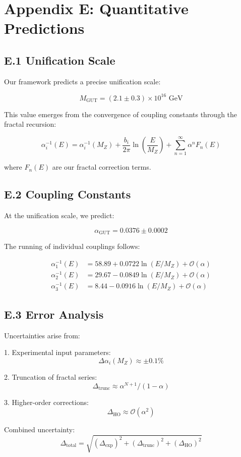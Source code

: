 \section*{Appendix E: Quantitative Predictions}

\subsection*{E.1 Unification Scale}

Our framework predicts a precise unification scale:

\[
M_{\text{GUT}} = (2.1 \pm 0.3) \times 10^{16} \text{ GeV}
\]

This value emerges from the convergence of coupling constants through the fractal recursion:

\[
\alpha_i^{-1}(E) = \alpha_i^{-1}(M_Z) + \frac{b_i}{2\pi}\ln\left(\frac{E}{M_Z}\right) + \sum_{n=1}^{\infty} \alpha^n F_n(E)
\]

where $F_n(E)$ are our fractal correction terms.

\subsection*{E.2 Coupling Constants}

At the unification scale, we predict:

\[
\alpha_{\text{GUT}} = 0.0376 \pm 0.0002
\]

The running of individual couplings follows:

\begin{align*}
\alpha_1^{-1}(E) &= 58.89 + 0.0722\ln(E/M_Z) + \mathcal{O}(\alpha) \\
\alpha_2^{-1}(E) &= 29.67 - 0.0849\ln(E/M_Z) + \mathcal{O}(\alpha) \\
\alpha_3^{-1}(E) &= 8.44 - 0.0916\ln(E/M_Z) + \mathcal{O}(\alpha)
\end{align*}

\subsection*{E.3 Error Analysis}

Uncertainties arise from:

1. Experimental input parameters:
   \[
   \Delta\alpha_i(M_Z) \approx \pm 0.1\%
   \]

2. Truncation of fractal series:
   \[
   \Delta_{\text{trunc}} \approx \alpha^{N+1}/(1-\alpha)
   \]

3. Higher-order corrections:
   \[
   \Delta_{\text{HO}} \approx \mathcal{O}(\alpha^2)
   \]

Combined uncertainty:
\[
\Delta_{\text{total}} = \sqrt{(\Delta_{\text{exp}})^2 + (\Delta_{\text{trunc}})^2 + (\Delta_{\text{HO}})^2}
\] 
